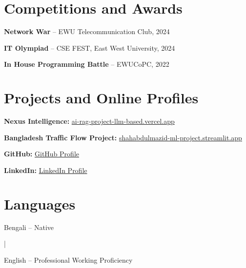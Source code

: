 ﻿\documentclass[10pt,a4paper]{article}
\begin{document}

\section{Competitions and Awards}

\textbf{Network War} -- EWU Telecommunication Club, 2024

\textbf{IT Olympiad} -- CSE FEST, East West University, 2024

\textbf{In House Programming Battle} -- EWUCoPC, 2022


\section{Projects and Online Profiles}

\textbf{Nexus Intelligence:}
\href{https://ai-rag-project-llm-based.vercel.app/auth/login}
{ai-rag-project-llm-based.vercel.app}

\vspace{1mm}

\textbf{Bangladesh Traffic Flow Project:}
\href{https://shahabdulmazid-ml-project.streamlit.app/}
{shahabdulmazid-ml-project.streamlit.app}

\vspace{1mm}

\textbf{GitHub:}
\href{https://github.com/}
{GitHub Profile}

\vspace{1mm}

\textbf{LinkedIn:}
\href{https://www.linkedin.com/}
{LinkedIn Profile}


\section{Languages}

Bengali -- Native

\quad | \quad

English -- Professional Working Proficiency
\end{document}
